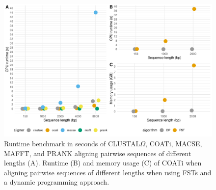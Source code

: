 


\begin{figure}[h!]
    \includegraphics[scale=0.8]{figures/benchmark_fst_dp_alns.pdf}
    \caption{Runtime benchmark in seconds of CLUSTAL$\Omega$, COATi, MACSE,
    MAFFT, and PRANK aligning pairwise sequences of different lengths (A).
    Runtime (B) and memory usage (C) of COATi when aligning pairwise sequences
    of different lengths when using FSTs and a dynamic programming approach.}
    \label{fig:benchmark}
\end{figure}
